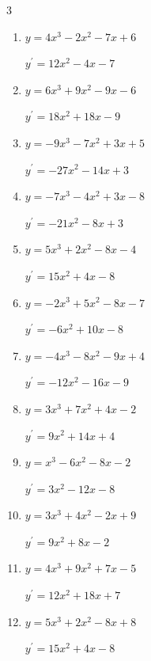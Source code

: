 \begin{multicols}{3}
\begin{enumerate}
        $\displaystyle y^{\prime}=-24x^{2}+4x-6$

  \item $y=4x^{3}-2x^{2}-7x+6$

        $\displaystyle y^{\prime}=12x^{2}-4x-7$

  \item $y=6x^{3}+9x^{2}-9x-6$

        $\displaystyle y^{\prime}=18x^{2}+18x-9$

  \item $y=-9x^{3}-7x^{2}+3x+5$

        $\displaystyle y^{\prime}=-27x^{2}-14x+3$

  \item $y=-7x^{3}-4x^{2}+3x-8$

        $\displaystyle y^{\prime}=-21x^{2}-8x+3$

  \item $y=5x^{3}+2x^{2}-8x-4$

        $\displaystyle y^{\prime}=15x^{2}+4x-8$

  \item $y=-2x^{3}+5x^{2}-8x-7$

        $\displaystyle y^{\prime}=-6x^{2}+10x-8$

\columnbreak %

\resetques

  \item $y=-4x^{3}-8x^{2}-9x+4$

        $\displaystyle y^{\prime}=-12x^{2}-16x-9$

  \item $y=3x^{3}+7x^{2}+4x-2$

        $\displaystyle y^{\prime}=9x^{2}+14x+4$

  \item $y=x^{3}-6x^{2}-8x-2$

        $\displaystyle y^{\prime}=3x^{2}-12x-8$

  \item $y=3x^{3}+4x^{2}-2x+9$

        $\displaystyle y^{\prime}=9x^{2}+8x-2$

  \item $y=4x^{3}+9x^{2}+7x-5$

        $\displaystyle y^{\prime}=12x^{2}+18x+7$

  \item $y=5x^{3}+2x^{2}-8x+8$

        $\displaystyle y^{\prime}=15x^{2}+4x-8$


\end{enumerate}
\end{multicols}
